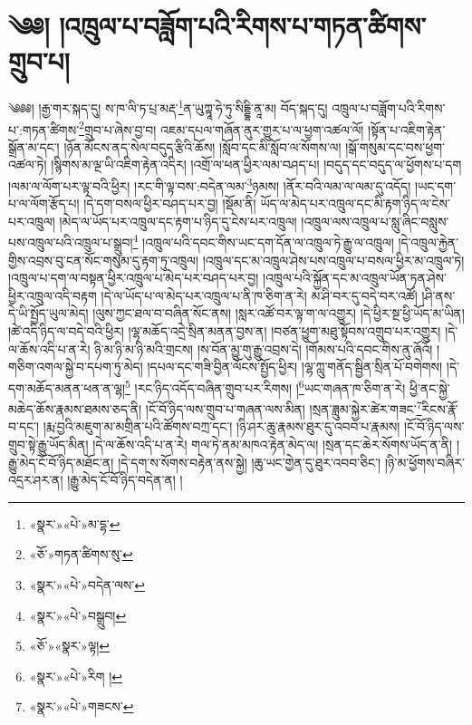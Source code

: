 \chapter{༄༅། །འཁྲུལ་པ་བཟློག་པའི་རིགས་པ་གཏན་ཚིགས་གྲུབ་པ།}༄༅༅། །རྒྱ་གར་སྐད་དུ། ས་ཁ་ལི་ཏ་པྲ་མརྡ་\footnote{«སྣར་»«པེ་»མ་དྷ་}ན་ཡུཀྟཱ་ཧེ་ཏུ་སིདྡྷི་ནཱ་མ། བོད་སྐད་དུ། འཁྲུལ་པ་བཟློག་པའི་རིགས་པ་:གཏན་ཚིགས་\footnote{«ཅོ་»གཏན་ཚིགས་སུ་}གྲུབ་པ་ཞེས་བྱ་བ། འཇམ་དཔལ་གཞོན་ནུར་གྱུར་པ་ལ་ཕྱག་འཚལ་ལོ། །སྟོན་པ་འཇིག་རྟེན་སྒྲོན་མ་དང་། །ཉོན་མོངས་ནད་སེལ་བདུད་རྩིའི་ཆོས། །སློབ་དང་མི་སློབ་ལ་སོགས་ལ། །སྒོ་གསུམ་དང་བས་ཕྱག་འཚལ་ཏེ། །སྙིགས་མ་ལྔ་ཡི་འཇིག་རྟེན་འདིར། །འགྲོ་ལ་ཕན་ཕྱིར་ལམ་བཤད་པ། །བདུད་དང་བདུད་ལ་ཕྱོགས་པ་དག །ལམ་ལ་ལོག་པར་ལྟ་བའི་ཕྱིར། །རང་གི་ལྟ་བས་:བདེན་ལམ་\footnote{«སྣར་»«པེ་»བདེན་ལས་}ཉམས། །ནོར་བའི་ལམ་ལ་ལམ་དུ་འདོད། །ཡང་དག་པ་ལ་ལོག་རྩོད་པ། །དེ་དག་བསལ་ཕྱིར་བཤད་པར་བྱ། །སྡོམ་ནི། ཡོད་ལ་མེད་པར་འཁྲུལ་དང་མི་རྟག་ཉིད་ལ་ངེས་པར་འཁྲུལ། །མེད་ལ་ཡོད་པར་འཁྲུལ་དང་རྟག་པ་ཉིད་དུ་ངེས་པར་འཁྲུལ། །འཁྲུལ་ལས་འཁྲུལ་པ་སླུ་ཞིང་བསླུས་པས་འཁྲུལ་པའི་འཁྲུལ་པ་སྒྲུབ།\footnote{«སྣར་»«པེ་»བསྒྲུབ།} །འཁྲུལ་པའི་དབང་གིས་ཡང་དག་དོན་ལ་འཁྲུལ་ཏེ་རྒྱུ་ལ་འཁྲུལ། །དེ་འཁྲུལ་རྐྱེན་གྱིས་འབྲས་བུ་ངན་སོང་གསུམ་དུ་རྟག་ཏུ་འཁྲུལ། །འཁྲུལ་དང་མ་འཁྲུལ་ཤེས་པས་འཁྲུལ་པ་བསལ་ཕྱིར་མ་འཁྲུལ་ཏེ། །འཁྲུལ་པ་དག་ལ་བསྟན་ཕྱིར་འཁྲུལ་པ་མེད་པར་བཤད་པར་བྱ། །འཁྲུལ་པའི་སྐྱོན་དང་མ་འཁྲུལ་ཡོན་ཏན་ཤེས་ཕྱིར་འཁྲུལ་འདི་བརྟག །དེ་ལ་ཡོད་པ་ལ་མེད་པར་འཁྲུལ་པ་ནི་ཁ་ཅིག་ན་རེ། མ་ཤི་བར་དུ་བདེ་བར་འཚོ། །ཤི་ནས་དེ་ཡི་སྤྱོད་ཡུལ་མེད། །ལུས་ཀྱང་ཐལ་བ་བཞིན་སོང་ནས། །སླར་འཚོ་བར་ལྟ་ག་ལ་འགྱུར། །དེ་ཕྱིར་སྔ་ཕྱི་ཡོད་མ་ཡིན། །ཚེ་འདི་ཉིད་ལ་བདེ་བའི་ཕྱིར། །ལྷ་མཆོད་འདྲེ་སྲིན་མནན་བྱས་ན། །བཙན་ཕྱུག་མཐུ་སྟོབས་འགྲུབ་པར་འགྱུར། །དེ་ལ་ཆོས་འདི་པ་ན་རེ། ཉི་མ་ཉི་མ་ཉི་མའི་གྲངས། །ས་བོན་མྱུ་གུ་རྒྱུ་འབྲས་དེ། །གོམས་པའི་དབང་གིས་ནུ་ཞོའོ། །གཅིག་འགལ་སྐྱེ་བ་དཔག་ཏུ་མེད། །དཔལ་དང་གཟི་བྱིན་ལོངས་སྤྱོད་ཕྱིར། །ལྷ་ཀླུ་གནོད་སྦྱིན་སྲིན་པོ་བགེགས། །དེ་དག་མཆོད་མནན་ཕན་ན་ལྷ།\footnote{«ཅོ་»«སྣར་»ལྟ།} །རང་ཉིད་འདོད་བཞིན་གྲུབ་པར་རིགས། །\footnote{«སྣར་»«པེ་»རིག །}ཡང་གཞན་ཁ་ཅིག་ན་རེ། ཕྱི་ནང་སྐྱེ་མཆེད་ཆོས་རྣམས་ཐམས་ཅད་ནི། །ངོ་བོ་ཉིད་ལས་གྲུབ་པ་གཞན་ལས་མིན། །སྲན་ཟླུམ་སྐྱེར་ཚེར་གཟང་\footnote{«སྣར་»«པེ་»གཟངས་}རིངས་རྣོ་བ་དང་། །རྨ་བྱའི་མཇུག་མ་མགྲིན་པའི་ཚོགས་བཀྲ་དང་། །ཉི་ཤར་ཆུ་རྣམས་ཐུར་དུ་འབབ་པ་རྣམས། །ངོ་བོ་ཉིད་ལས་གྲུབ་སྟེ་རྒྱུ་ཡོད་མིན། །དེ་ལ་ཆོས་འདི་པ་ན་རེ། གལ་ཏེ་ནམ་མཁའ་རྟེན་མེད་ལ། །སྲན་དང་ཆེར་སོགས་ཡོད་ན་ནི། །རྒྱུ་མེད་ངོ་བོ་ཉིད་མཐོང་ན། །དེ་དག་ས་སོགས་བརྟེན་ནས་སྐྱེ། །ཆུ་ཡང་གྱེན་དུ་ཐུར་འབབ་ཅིང་། །ཉི་མ་ཕྱོགས་བཞིར་འདྲར་ཤར་ན། །རྒྱུ་མེད་ངོ་བོ་ཉིད་བདེན་ན། །
